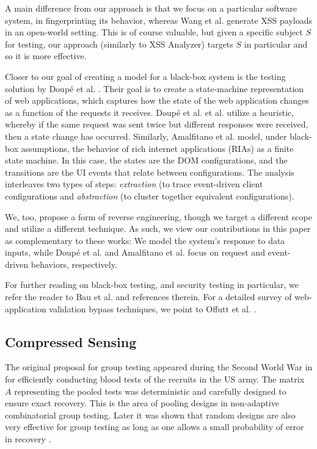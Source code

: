 A main difference from our approach is that we focus on a particular software system, in fingerprinting its behavior, whereas Wang et al. generate XSS payloads in an open-world setting. This is of course valuable, but given a specific subject $S$ for testing, our approach (similarly to XSS Analyzer) targets $S$ in particular and so it is more effective.

Closer to our goal of creating a model for a black-box system is the testing solution by Doup\'e et al. \cite{Doupe:2012}. Their goal is to create a state-machine representation of web applications, which captures
how the state of the web application changes as a function of the requests it receives. Doup\'e et al. et al. utilize a heuristic, whereby if the same request was sent twice but different responses were received, then a state change has occurred. Similarly, Amalfitano et al. \cite{Amalfitano:FT08} model, under black-box assumptions, the behavior of rich internet applications (RIAs) as a finite state machine. In this case, the states are the DOM configurations, and the transitions are the UI events that relate between configurations. The analysis interleaves two types of steps: \emph{extraction} (to trace event-driven client configurations and \emph{abstraction} (to cluster together equivalent configurations).

We, too, propose a form of reverse engineering, though we target a different scope and utilize a different technique. As such, we view our contributions in this paper as complementary to these works: We model the system's response to data inputs, while Doup\'e et al. and Amalfitano et al. focus on request and event-driven behaviors, respectively.

For further reading on black-box testing, and security testing in particular, we refer the reader to Bau et al. \cite{Bau:2010} and references therein. For a detailed survey of web-application validation bypass techniques, we point to Offutt et al. \cite{Offutt1,Offutt2,Offutt3}. 

\subsection{Compressed Sensing}

The original proposal for group testing appeared during the Second World War in \cite{dorfman1943detection}
for efficiently conducting blood tests of the recruits in the US army. The matrix $A$ representing
the pooled tests was deterministic and carefully designed to ensure exact recovery.  This is 
the area of pooling designs in non-adaptive combinatorial group testing.  Later it was shown 
that random designs are also very effective for group testing as long as one allows a small
probability of error in recovery \cite{Malyutov78}.

